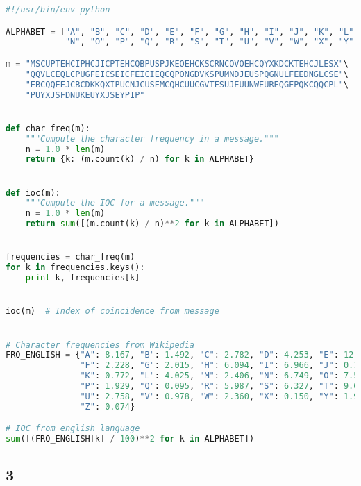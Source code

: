 \documentclass[12pt]{article}
\begin{document}
\begin{lstlisting}[language=Python, caption=Code for answering problem 2.A]
#!/usr/bin/env python

ALPHABET = ["A", "B", "C", "D", "E", "F", "G", "H", "I", "J", "K", "L", "M",
            "N", "O", "P", "Q", "R", "S", "T", "U", "V", "W", "X", "Y", "Z"]

m = "MSCUPTEHCIPHCJICPTEHCQBPUSPJKEOEHCKSCRNCQVOEHCQYXKDCKTEHCJLESX"\
    "QQVLCEQLCPUGFEICSEICFEICIEQCQPONGDVKSPUMNDJEUSPQGNULFEEDNGLCSE"\
    "EBCQQEEJCBCDKKQXIPUCNJCUSEMCQHCUUCGVTESUJEUUNWEUREQGFPQKCQQCPL"\
    "PUYXJSFDNUKEUYXJSEYPIP"


def char_freq(m):
    """Compute the character frequency in a message."""
    n = 1.0 * len(m)
    return {k: (m.count(k) / n) for k in ALPHABET}


def ioc(m):
    """Compute the IOC for a message."""
    n = 1.0 * len(m)
    return sum([(m.count(k) / n)**2 for k in ALPHABET])


frequencies = char_freq(m)
for k in frequencies.keys():
    print k, frequencies[k]


ioc(m)  # Index of coincidence from message


# Character frequencies from Wikipedia
FRQ_ENGLISH = {"A": 8.167, "B": 1.492, "C": 2.782, "D": 4.253, "E": 12.702,
               "F": 2.228, "G": 2.015, "H": 6.094, "I": 6.966, "J": 0.153,
               "K": 0.772, "L": 4.025, "M": 2.406, "N": 6.749, "O": 7.507,
               "P": 1.929, "Q": 0.095, "R": 5.987, "S": 6.327, "T": 9.056,
               "U": 2.758, "V": 0.978, "W": 2.360, "X": 0.150, "Y": 1.974,
               "Z": 0.074}

# IOC from english language
sum([(FRQ_ENGLISH[k] / 100)**2 for k in ALPHABET])  
\end{lstlisting}


\newpage



\subsection*{3}
\end{document}
